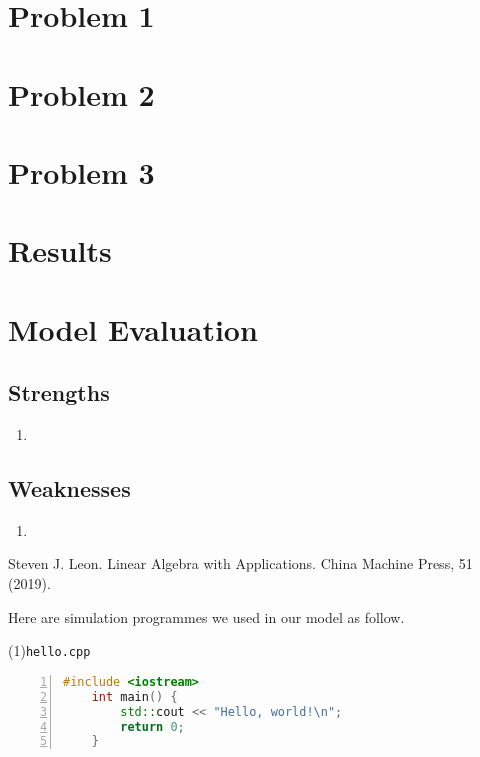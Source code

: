 \documentclass[UTF8]{mcmthesis}
\begin{document}
    \section{Problem 1}
    \section{Problem 2}
    \section{Problem 3}
    \section{Results}
    \section{Model Evaluation}
        \subsection{Strengths}
            \begin{enumerate}
                \item 
            \end{enumerate}
            
        \subsection{Weaknesses}
            \begin{enumerate}
                \item 
            \end{enumerate}


        \begin{thebibliography}{99}
            Steven J. Leon.
            Linear Algebra with Applications.
            China Machine Press, 51 (2019).
        \end{thebibliography}


    \begin{appendices}
        Here are simulation programmes we used in our model as follow.
        
        \vspace{.5em}
        \noindent(1)\quad \verb|hello.cpp|
        \vspace{.5em}
        \begin{lstlisting}[language = c++, numbers = left]
    #include <iostream>
    int main() {
        std::cout << "Hello, world!\n";
        return 0;
    }
        \end{lstlisting}

    \end{appendices}
\end{document}
